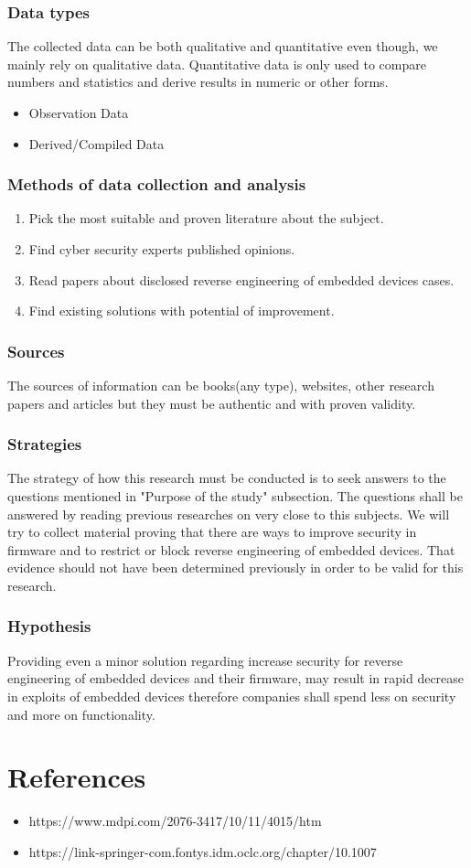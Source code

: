 \documentclass[]{report}
\begin{document}
\subsection{Data types}
The collected data can be both qualitative and quantitative even though, we mainly rely on qualitative data.
Quantitative data is only used to compare numbers and statistics and derive results in numeric or other forms.
\begin{itemize}
	\item Observation Data
	\item Derived/Compiled Data
\end{itemize}
\subsection{Methods of data collection and analysis}
\begin{enumerate}
	\item Pick the most suitable and proven literature about the subject.
	\item Find cyber security experts published opinions.
	\item Read papers about disclosed reverse engineering of embedded devices cases.
	\item Find existing solutions with potential of improvement.
\end{enumerate}
\subsection{Sources}
The sources of information can be books(any type), websites, other research papers and articles but they must be authentic and with proven validity.
\subsection{Strategies}
The strategy of how this research must be conducted is to seek answers to the questions mentioned in "Purpose of the study" subsection. The questions shall be answered by reading previous researches on very close to this subjects.
We will try to collect material proving that there are ways to improve security in firmware and to restrict or block reverse engineering of embedded devices. That evidence should not have been determined previously in order to be valid for this research.
\subsection{Hypothesis}
Providing even a minor solution regarding increase security for reverse engineering of embedded devices and their firmware, may result in rapid decrease in exploits of embedded devices therefore companies shall spend less on security and more on functionality.
\chapter{References}
\begin{itemize}
	\item https://www.mdpi.com/2076-3417/10/11/4015/htm
	\item https://link-springer-com.fontys.idm.oclc.org/chapter/10.1007%
\end{itemize}
\end{document}
